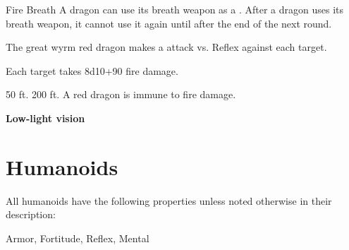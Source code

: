    \begin{freeability}{Fire Breath}
      A dragon can use its breath weapon as a .
      After a dragon uses its breath weapon, it cannot use it again until after the end of the next round.
      \par The great wyrm red dragon makes a  attack
        vs. Reflex against each target.
    
    \hit Each target takes 8d10+90 fire damage.
    \end{freeability}
  
      
       50 ft.
     200 ft.
     A red dragon is immune to fire damage.
    \par\noindent\textbf{Low-light vision}
  
  
        \newpage
        \section{Humanoids}

        All humanoids have the following properties unless noted otherwise in their description:
        
    
     Armor,
     Fortitude,
     Reflex,
     Mental
  
  
      
